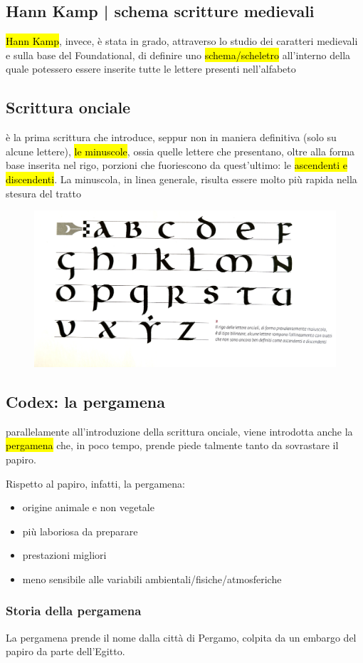 \subsection{Hann Kamp | schema scritture medievali}
\hl{Hann Kamp}, invece, è stata in grado, attraverso lo studio dei caratteri medievali e sulla base del Foundational, di definire uno \hl{schema/scheletro} all'interno della quale potessero essere inserite tutte le lettere presenti nell'alfabeto
\subsection{Scrittura onciale}
è la prima scrittura che introduce, seppur non in maniera definitiva (solo su alcune lettere), \hl{le minuscole}, ossia quelle lettere che presentano, oltre alla forma base inserita nel rigo, porzioni che fuoriescono da quest'ultimo: le \hl{ascendenti e discendenti}. La minuscola, in linea generale, risulta essere molto più rapida nella stesura del tratto 
\begin{figure}[H]
    \centering
    \includegraphics[width=0.4\linewidth]{lezione_3/imgs/onciale.jpg}
\end{figure}
\subsection{Codex: la pergamena}
parallelamente all'introduzione della scrittura onciale, viene introdotta anche la \hl{pergamena} che, in poco tempo, prende piede talmente tanto da sovrastare il papiro.

Rispetto al papiro, infatti, la pergamena:
\begin{itemize}
    \item origine animale e non vegetale
    \item più laboriosa da preparare
    \item prestazioni migliori
    \item meno sensibile alle variabili ambientali/fisiche/atmosferiche
\end{itemize}
\subsubsection{Storia della pergamena}
La pergamena prende il nome dalla città di Pergamo, colpita da un embargo del papiro da parte dell'Egitto.

